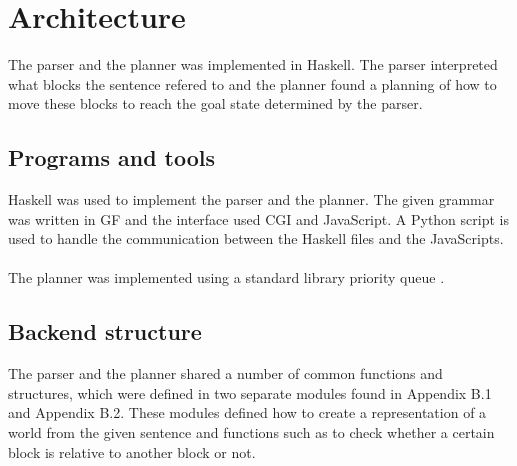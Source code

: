 \chapter{Architecture}
The parser and the planner was implemented in Haskell. The parser interpreted what blocks the sentence refered to and the planner found a planning of how to move these blocks to reach the goal state determined by the parser. 

\section{Programs and tools}
Haskell was used to implement the parser and the planner. The given grammar was written in GF and the interface used CGI and JavaScript. A Python script is used to handle the communication between the Haskell files and the JavaScripts.
\\\\
The planner was implemented using a standard library priority queue \citep{psq_url}. 

\section{Backend structure}
The parser and the planner shared a number of common functions and structures, which were defined in two separate modules found in Appendix B.1 and Appendix B.2. These modules defined how to create a representation of a world from the given sentence and functions such as to check whether a certain block is relative to another block or not. 

